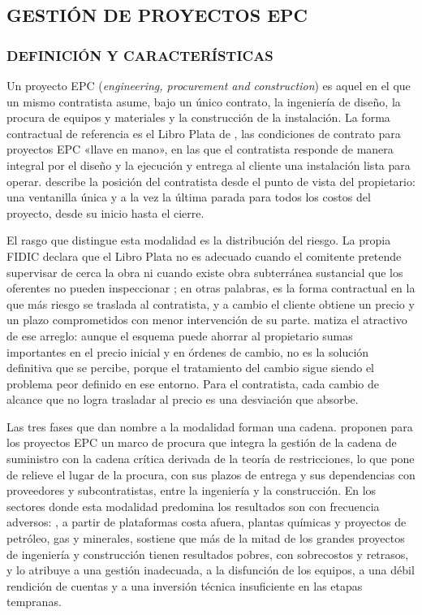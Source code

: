 \subsection{GESTIÓN DE PROYECTOS EPC}
\subsubsection{DEFINICIÓN Y CARACTERÍSTICAS}

Un proyecto EPC (\textit{engineering, procurement and construction}) es aquel en el que un mismo contratista asume, bajo un único contrato, la ingeniería de diseño, la procura de equipos y materiales y la construcción de la instalación. La forma contractual de referencia es el Libro Plata de \textcite{FIDIC2017}, las condiciones de contrato para proyectos EPC «llave en mano», en las que el contratista responde de manera integral por el diseño y la ejecución y entrega al cliente una instalación lista para operar. \textcite{Galloway2009} describe la posición del contratista desde el punto de vista del propietario: una ventanilla única y a la vez la última parada para todos los costos del proyecto, desde su inicio hasta el cierre.

El rasgo que distingue esta modalidad es la distribución del riesgo. La propia FIDIC declara que el Libro Plata no es adecuado cuando el comitente pretende supervisar de cerca la obra ni cuando existe obra subterránea sustancial que los oferentes no pueden inspeccionar \parencite{FIDIC2017}; en otras palabras, es la forma contractual en la que más riesgo se traslada al contratista, y a cambio el cliente obtiene un precio y un plazo comprometidos con menor intervención de su parte. \textcite{Galloway2009} matiza el atractivo de ese arreglo: aunque el esquema puede ahorrar al propietario sumas importantes en el precio inicial y en órdenes de cambio, no es la solución definitiva que se percibe, porque el tratamiento del cambio sigue siendo el problema peor definido en ese entorno. Para el contratista, cada cambio de alcance que no logra trasladar al precio es una desviación que absorbe.

Las tres fases que dan nombre a la modalidad forman una cadena. \textcite{Yeo2002} proponen para los proyectos EPC un marco de procura que integra la gestión de la cadena de suministro con la cadena crítica derivada de la teoría de restricciones, lo que pone de relieve el lugar de la procura, con sus plazos de entrega y sus dependencias con proveedores y subcontratistas, entre la ingeniería y la construcción. En los sectores donde esta modalidad predomina los resultados son con frecuencia adversos: \textcite{Merrow2011}, a partir de plataformas costa afuera, plantas químicas y proyectos de petróleo, gas y minerales, sostiene que más de la mitad de los grandes proyectos de ingeniería y construcción tienen resultados pobres, con sobrecostos y retrasos, y lo atribuye a una gestión inadecuada, a la disfunción de los equipos, a una débil rendición de cuentas y a una inversión técnica insuficiente en las etapas tempranas.

